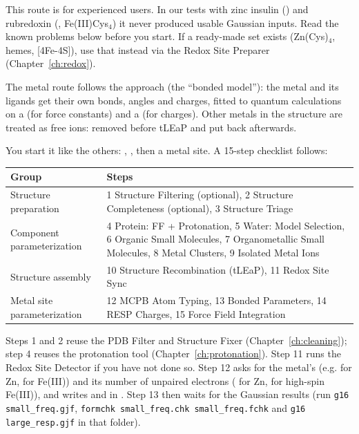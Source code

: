 \begin{watchout}
This route is for experienced users. In our tests with zinc insulin
() and rubredoxin (, Fe(III)Cys$_4$) it never produced
usable Gaussian inputs. Read the known problems below before you start. If a
ready-made set exists (Zn(Cys)$_4$, hemes, [4Fe-4S]), use that instead via
the Redox Site Preparer (Chapter~\ref{ch:redox}).
\end{watchout}

The metal route follows the  approach (the ``bonded model''): the
metal and its ligands get their own bonds, angles and charges, fitted to
quantum calculations on a  (for force constants) and a
 (for charges). Other metals in the structure are treated
as free ions: removed before tLEaP and put back afterwards.

You start it like the others: , , then a metal site. A 15-step
checklist follows:

\begin{tabularx}{\linewidth}{@{}lL@{}}
\toprule
\textbf{Group} & \textbf{Steps} \\
\midrule
Structure preparation & 1 Structure Filtering (optional), 2 Structure
  Completeness (optional), 3 Structure Triage \\
Component parameterization & 4 Protein: FF + Protonation, 5 Water: Model
  Selection, 6 Organic Small Molecules, 7 Organometallic Small Molecules,
  8 Metal Clusters, 9 Isolated Metal Ions \\
Structure assembly & 10 Structure Recombination (tLEaP), 11 Redox Site
  Sync \\
Metal site parameterization & 12 MCPB Atom Typing, 13 Bonded Parameters,
  14 RESP Charges, 15 Force Field Integration \\
\bottomrule
\end{tabularx}

\medskip
Steps 1 and 2 reuse the PDB Filter and Structure Fixer
(Chapter~\ref{ch:cleaning}); step 4 reuses the protonation tool
(Chapter~\ref{ch:protonation}). Step 11 runs the Redox Site Detector if you
have not done so. Step 12 asks for the metal's  (e.g.
 for Zn,  for Fe(III)) and its number of unpaired
electrons ( for Zn,  for high-spin Fe(III)), and writes
 and  in
. Step 13 then waits for the Gaussian results (run
\texttt{g16 small\_freq.gjf}, \texttt{formchk small\_freq.chk
small\_freq.fchk} and \texttt{g16 large\_resp.gjf} in that folder).

